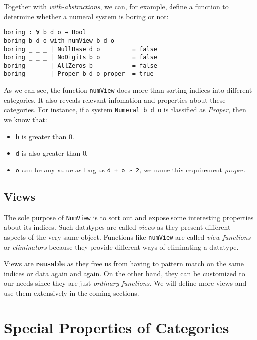 \documentclass[\main/thesis.tex]{subfiles}
\begin{document}
Together with \textit{with-abstractions}, we can, for example, define a function
to determine whether a numeral system is boring or not:

\begin{lstlisting}
boring : ∀ b d o → Bool
boring b d o with numView b d o
boring _ _ _ | NullBase d o         = false
boring _ _ _ | NoDigits b o         = false
boring _ _ _ | AllZeros b           = false
boring _ _ _ | Proper b d o proper  = true
\end{lstlisting}

As we can see, the function {\lstinline|numView|} does more than sorting indices
into different categories. It also reveals relevant infomation and properties
about these categories. For instance, if a system {\lstinline|Numeral b d o|}
is classified as \textit{Proper}, then we know that:

\begin{itemize}
    \item {\lstinline|b|} is greater than $ 0 $.
    \item {\lstinline|d|} is also greater than $ 0 $.
    \item {\lstinline|o|} can be any value as long as {\lstinline|d + o ≥ 2|};
        we name this requirement \textit{proper}.
\end{itemize}

\subsection{Views}

The sole purpose of {\lstinline|NumView|} is to sort out and expose some
interesting properties about its indices.
Such datatypes are called \textit{views}\cite{wadler1987views} as they present
different aspects of the very same object.
Functions like {\lstinline|numView|} are called \textit{view functions} or
\textit{eliminators}\cite{mcbride2004views} because they provide different ways
of eliminating a datatype.

Views are \textbf{reusable} as they free us from having to pattern match on the
same indices or data again and again. On the other hand, they can be customized
to our needs since they are just \textit{ordinary functions}.
We will define more views and use them extensively in the coming sections.

\section{Special Properties of Categories}
\end{document}
